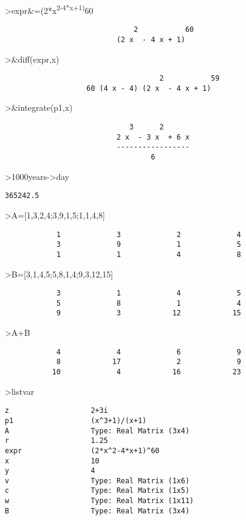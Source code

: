 \documentclass[
]{book}
\begin{document}
\textgreater expr\&=(2*x\textsuperscript{2-4*x+1)}60

\begin{verbatim}
                              2           60
                          (2 x  - 4 x + 1)
\end{verbatim}

\textgreater\&diff(expr,x)

\begin{verbatim}
                                    2           59
                   60 (4 x - 4) (2 x  - 4 x + 1)
\end{verbatim}

\textgreater\&integrate(p1,x)

\begin{verbatim}
                             3      2
                          2 x  - 3 x  + 6 x
                          -----------------
                                  6
\end{verbatim}

\textgreater1000years-\textgreater day

\begin{verbatim}
365242.5
\end{verbatim}

\textgreater A={[}1,3,2,4;3,9,1,5;1,1,4,8{]}

\begin{verbatim}
            1             3             2             4 
            3             9             1             5 
            1             1             4             8 
\end{verbatim}

\textgreater B={[}3,1,4,5;5,8,1,4;9,3,12,15{]}

\begin{verbatim}
            3             1             4             5 
            5             8             1             4 
            9             3            12            15 
\end{verbatim}

\textgreater A+B

\begin{verbatim}
            4             4             6             9 
            8            17             2             9 
           10             4            16            23 
\end{verbatim}

\textgreater listvar

\begin{verbatim}
z                   2+3i
p1                  (x^3+1)/(x+1)
A                   Type: Real Matrix (3x4)
r                   1.25
expr                (2*x^2-4*x+1)^60
x                   10
y                   4
v                   Type: Real Matrix (1x6)
c                   Type: Real Matrix (1x5)
w                   Type: Real Matrix (1x11)
B                   Type: Real Matrix (3x4)
\end{verbatim}

\backmatter
\end{document}
